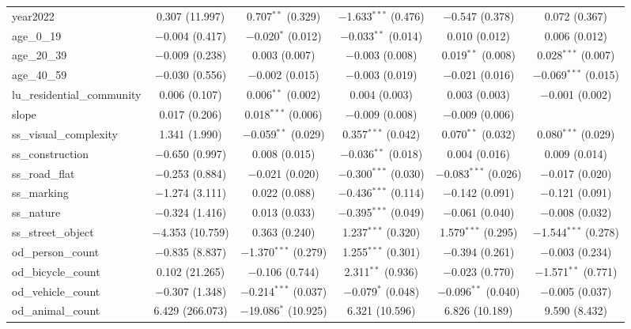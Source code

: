\begin{table}[!htbp]
\begin{tabular}{@{\extracolsep{1pt}}lccccc}
  year2022 & 0.307 (11.997) & 0.707$^{**}$ (0.329) & $-$1.633$^{***}$ (0.476) & $-$0.547 (0.378) & 0.072 (0.367) \\ 
  age\_0\_19 & $-$0.004 (0.417) & $-$0.020$^{*}$ (0.012) & $-$0.033$^{**}$ (0.014) & 0.010 (0.012) & 0.006 (0.012) \\ 
  age\_20\_39 & $-$0.009 (0.238) & 0.003 (0.007) & $-$0.003 (0.008) & 0.019$^{**}$ (0.008) & 0.028$^{***}$ (0.007) \\ 
  age\_40\_59 & $-$0.030 (0.556) & $-$0.002 (0.015) & $-$0.003 (0.019) & $-$0.021 (0.016) & $-$0.069$^{***}$ (0.015) \\ 
  lu\_residential\_community & 0.006 (0.107) & 0.006$^{**}$ (0.002) & 0.004 (0.003) & 0.003 (0.003) & $-$0.001 (0.002) \\ 
  slope & 0.017 (0.206) & 0.018$^{***}$ (0.006) & $-$0.009 (0.008) & $-$0.009 (0.006) &  \\ 
  ss\_visual\_complexity & 1.341 (1.990) & $-$0.059$^{**}$ (0.029) & 0.357$^{***}$ (0.042) & 0.070$^{**}$ (0.032) & 0.080$^{***}$ (0.029) \\ 
  ss\_construction & $-$0.650 (0.997) & 0.008 (0.015) & $-$0.036$^{**}$ (0.018) & 0.004 (0.016) & 0.009 (0.014) \\ 
  ss\_road\_flat & $-$0.253 (0.884) & $-$0.021 (0.020) & $-$0.300$^{***}$ (0.030) & $-$0.083$^{***}$ (0.026) & $-$0.017 (0.020) \\ 
  ss\_marking & $-$1.274 (3.111) & 0.022 (0.088) & $-$0.436$^{***}$ (0.114) & $-$0.142 (0.091) & $-$0.121 (0.091) \\ 
  ss\_nature & $-$0.324 (1.416) & 0.013 (0.033) & $-$0.395$^{***}$ (0.049) & $-$0.061 (0.040) & $-$0.008 (0.032) \\ 
  ss\_street\_object & $-$4.353 (10.759) & 0.363 (0.240) & 1.237$^{***}$ (0.320) & 1.579$^{***}$ (0.295) & $-$1.544$^{***}$ (0.278) \\ 
  od\_person\_count & $-$0.835 (8.837) & $-$1.370$^{***}$ (0.279) & 1.255$^{***}$ (0.301) & $-$0.394 (0.261) & $-$0.003 (0.234) \\ 
  od\_bicycle\_count & 0.102 (21.265) & $-$0.106 (0.744) & 2.311$^{**}$ (0.936) & $-$0.023 (0.770) & $-$1.571$^{**}$ (0.771) \\ 
  od\_vehicle\_count & $-$0.307 (1.348) & $-$0.214$^{***}$ (0.037) & $-$0.079$^{*}$ (0.048) & $-$0.096$^{**}$ (0.040) & $-$0.005 (0.037) \\ 
  od\_animal\_count & 6.429 (266.073) & $-$19.086$^{*}$ (10.925) & 6.321 (10.596) & 6.826 (10.189) & 9.590 (8.432) \\ 

\end{tabular}
\end{table}
